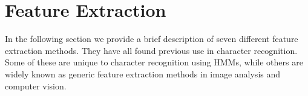\documentclass[runningheads]{llncs}
\begin{document}





\section{Feature Extraction}
\label{sec:feat}
In the following section we provide a brief description of seven different feature extraction methods. They have all found previous use in character recognition. Some of these are unique to character recognition using HMMs, while others are widely known as generic feature extraction methods in image analysis and computer vision.
\end{document}
